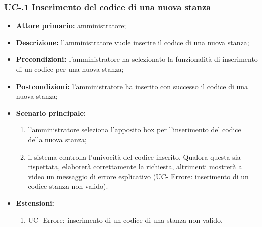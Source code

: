 \subsubsection{UC-.1 Inserimento del codice di una nuova stanza}
\begin{itemize}
	\item \textbf{Attore primario:} amministratore;
	\item \textbf{Descrizione:} l'amministratore vuole inserire il codice di una nuova stanza;
	\item \textbf{Precondizioni:} l'amministratore ha selezionato la funzionalità di inserimento di un codice per una nuova stanza;
	\item \textbf{Postcondizioni:} l'amministratore ha inserito con successo il codice di una nuova stanza;
	\item \textbf{Scenario principale:}
	      \begin{enumerate}
		      \item l'amministratore seleziona l'apposito box per l'inserimento del codice della nuova stanza;
		      \item il sistema controlla l'univocità del codice inserito. Qualora questa sia rispettata, elaborerà correttamente la richiesta, altrimenti mostrerà a video un messaggio di errore esplicativo (UC- Errore: inserimento di un codice stanza non valido).
	      \end{enumerate}
	\item \textbf{Estensioni:}
		\begin{enumerate}
		      \item UC- Errore: inserimento di un codice di una stanza non valido.
	      \end{enumerate}
\end{itemize}


